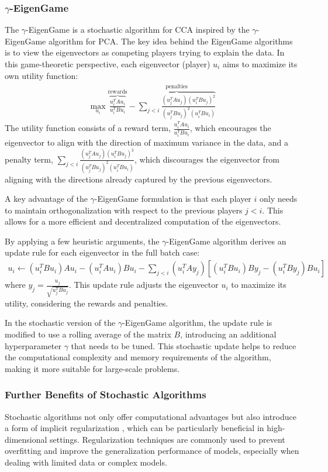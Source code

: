 \subsubsection{$\gamma$-EigenGame}
The $\gamma$-EigenGame is a stochastic algorithm for CCA inspired by the $\gamma$-EigenGame algorithm for PCA. The key idea behind the EigenGame algorithms is to view the eigenvectors as competing players trying to explain the data. In this game-theoretic perspective, each eigenvector (player) $u_i$ aims to maximize its own utility function:
\begin{align}
\max_{u_i} \overbrace{\frac{u_i^TAu_i}{u_i^TBu_i}}^{\text{rewards}} - \overbrace{\sum_{j < i} \frac{(u_j^TAu_j)(u_i^TBu_j)^2}{(u_j^TBu_j)^2(u_i^TBu_i)}}^{\text{penalties}}
\end{align}
The utility function consists of a reward term, $\frac{u_i^TAu_i}{u_i^TBu_i}$, which encourages the eigenvector to align with the direction of maximum variance in the data, and a penalty term, $\sum_{j < i} \frac{(u_j^TAu_j)(u_i^TBu_j)^2}{(u_j^TBu_j)^2(u_i^TBu_i)}$, which discourages the eigenvector from aligning with the directions already captured by the previous eigenvectors.

A key advantage of the $\gamma$-EigenGame formulation is that each player $i$ only needs to maintain orthogonalization with respect to the previous players $j < i$. This allows for a more efficient and decentralized computation of the eigenvectors.

By applying a few heuristic arguments, the $\gamma$-EigenGame algorithm derives an update rule for each eigenvector in the full batch case:
\begin{align}
u_i \leftarrow (u_i^T B u_i)A u_i - (u_i^T A u_i)B u_i - \sum_{j < i} (u_i^T A y_j)[(u_i^T B u_i)B y_j - (u_i^T B y_j)B u_i]
\end{align}
where $y_j = \frac{u_j}{\sqrt{u_j^TBu_j}}$. This update rule adjusts the eigenvector $u_i$ to maximize its utility, considering the rewards and penalties.

In the stochastic version of the $\gamma$-EigenGame algorithm, the update rule is modified to use a rolling average of the matrix $B$, introducing an additional hyperparameter $\gamma$ that needs to be tuned. This stochastic update helps to reduce the computational complexity and memory requirements of the algorithm, making it more suitable for large-scale problems.

\subsubsection{Further Benefits of Stochastic Algorithms}
Stochastic algorithms not only offer computational advantages but also introduce a form of implicit regularization \citep{smith2021origin}, which can be particularly beneficial in high-dimensional settings. Regularization techniques are commonly used to prevent overfitting and improve the generalization performance of models, especially when dealing with limited data or complex models.

